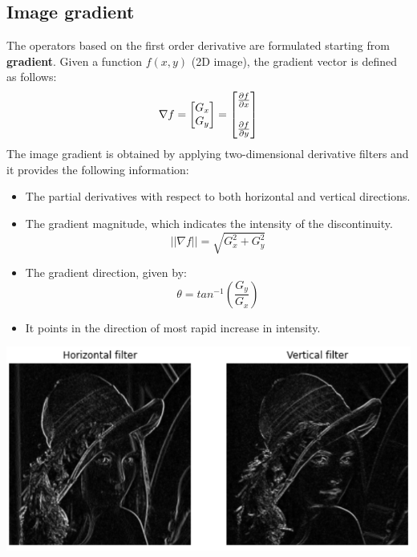 \subsection{Image gradient}
The operators based on the first order derivative are formulated starting from \textbf{gradient}. Given a function $f(x,y)$ (2D image), the gradient vector is defined as follows:
\[
    \nabla f = 
    \begin{bmatrix}
        G_{x}\\
        G_{y}\\
    \end{bmatrix}
    =
    \begin{bmatrix}
        \frac{\partial f}{\partial x}\\
        \vspace{1pt}\\
        \frac{\partial f}{\partial y}\\
    \end{bmatrix}
\]
The image gradient is obtained by applying two-dimensional derivative filters and it provides the following information:
\begin{itemize}
    \item The partial derivatives with respect to both horizontal and vertical directions.
    \item The gradient magnitude, which indicates the intensity of the discontinuity.
    \[|| \nabla f || = \sqrt{G_{x}^{2} + G_{y}^{2}}\]
    \item The gradient direction, given by:
    \[ \theta = tan^{-1} \left (\frac{G_{y}}{G_{x}} \right)\]
    \item It points in the direction of most rapid increase in intensity.
\end{itemize}
\begin{center}
    \includegraphics[scale = 0.8]{images/lena hx hy.png}
\end{center}
